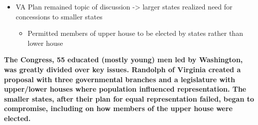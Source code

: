 \documentclass[a4paper]{article}
\begin{document}
{\begin{itemize}
\begin{itemize}
            \end{itemize}
            \item VA Plan remained topic of discussion -> larger states realized need for concessions to smaller states
            \begin{itemize}
                \item Permitted members of upper house to be elected by states rather than lower house
            \end{itemize}
        \end{itemize}
        \textbf{The Congress, 55 educated (mostly young) men led by Washington, was greatly divided over key issues. Randolph of Virginia created a proposal with three governmental branches and a legislature with upper/lower houses where population influenced representation. The smaller states, after their plan for equal representation failed, began to compromise, including on how members of the upper house were elected.}}
\end{document}
